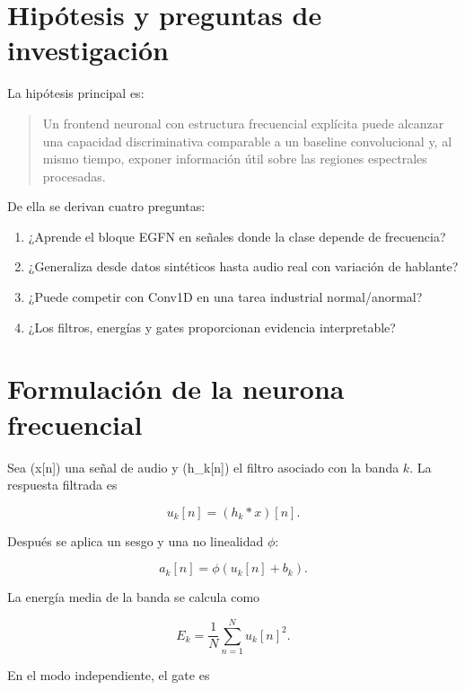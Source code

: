 \documentclass[11pt,a4paper]{article}
\begin{document}
\section{Hipótesis y preguntas de investigación}

La hipótesis principal es:

\begin{quote}
Un frontend neuronal con estructura frecuencial explícita puede alcanzar una
capacidad discriminativa comparable a un baseline convolucional y, al mismo
tiempo, exponer información útil sobre las regiones espectrales procesadas.
\end{quote}

De ella se derivan cuatro preguntas:

\begin{enumerate}
  \item ¿Aprende el bloque EGFN en señales donde la clase depende de frecuencia?
  \item ¿Generaliza desde datos sintéticos hasta audio real con variación de hablante?
  \item ¿Puede competir con Conv1D en una tarea industrial normal/anormal?
  \item ¿Los filtros, energías y gates proporcionan evidencia interpretable?
\end{enumerate}

\section{Formulación de la neurona frecuencial}

Sea (x[n]) una señal de audio y (h_k[n]) el filtro asociado con la banda
\(k\). La respuesta filtrada es

\begin{equation}
u_k[n] = (h_k * x)[n].
\end{equation}

Después se aplica un sesgo y una no linealidad \(\phi\):

\begin{equation}
a_k[n] = \phi\!\left(u_k[n] + b_k\right).
\end{equation}

La energía media de la banda se calcula como

\begin{equation}
E_k = \frac{1}{N}\sum_{n=1}^{N} u_k[n]^2.
\end{equation}

En el modo independiente, el gate es
\end{document}
